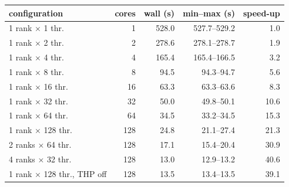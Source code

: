 \begin{tabular}{lrrrr}
\toprule
configuration & cores & wall (s) & min--max (s) & speed-up \\
\midrule
1 rank $\times$ 1 thr. & 1 & 528.0 & 527.7--529.2 & 1.0 \\
1 rank $\times$ 2 thr. & 2 & 278.6 & 278.1--278.7 & 1.9 \\
1 rank $\times$ 4 thr. & 4 & 165.4 & 165.4--166.5 & 3.2 \\
1 rank $\times$ 8 thr. & 8 & 94.5 & 94.3--94.7 & 5.6 \\
1 rank $\times$ 16 thr. & 16 & 63.3 & 63.3--63.6 & 8.3 \\
1 rank $\times$ 32 thr. & 32 & 50.0 & 49.8--50.1 & 10.6 \\
1 rank $\times$ 64 thr. & 64 & 34.5 & 33.2--34.5 & 15.3 \\
1 rank $\times$ 128 thr. & 128 & 24.8 & 21.1--27.4 & 21.3 \\
2 ranks $\times$ 64 thr. & 128 & 17.1 & 15.4--20.4 & 30.9 \\
4 ranks $\times$ 32 thr. & 128 & 13.0 & 12.9--13.2 & 40.6 \\
\midrule
1 rank $\times$ 128 thr., THP off & 128 & 13.5 & 13.4--13.5 & 39.1 \\
\bottomrule
\end{tabular}
